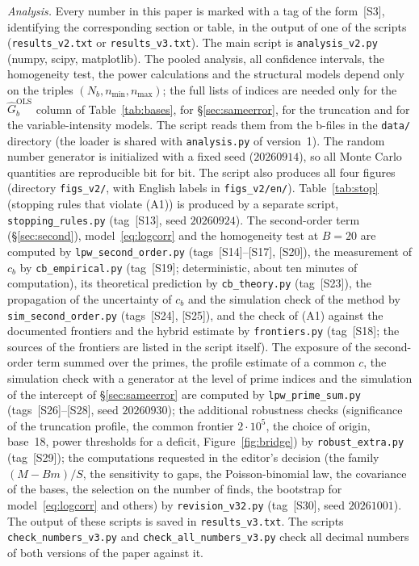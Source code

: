 \documentclass[11pt,a4paper]{article}
\theoremstyle{plain}
\theoremstyle{remark}
\begin{document}
\emph{Analysis.} Every number in this paper is marked with a tag of the
form~[S3], identifying the corresponding section or table, in the output of one
of the scripts (\texttt{results\_v2.txt} or \texttt{results\_v3.txt}). The main
script is \texttt{analysis\_v2.py} (numpy, scipy, matplotlib). The pooled
analysis, all confidence intervals, the homogeneity test, the power
calculations and the structural models depend only on the triples
$(N_b,n_{\min},n_{\max})$; the full lists of indices are needed only for the
$\hat G^{\mathrm{OLS}}_b$ column of Table~\ref{tab:bases}, for
\S\ref{sec:sameerror}, for the truncation and for the variable-intensity models.
The script reads them from the b-files in the \texttt{data/} directory (the
loader is shared with \texttt{analysis.py} of version~1). The random number
generator is initialized with a fixed seed ($20260914$), so all Monte Carlo
quantities are reproducible bit for bit. The script also produces all four
figures (directory \texttt{figs\_v2/}, with English labels in
\texttt{figs\_v2/en/}).
Table~\ref{tab:stop} (stopping rules that violate (A1)) is produced by a separate
script, \texttt{stopping\_rules.py} (tag~[S13], seed $20260924$). The
second-order term (\S\ref{sec:second}), model~\eqref{eq:logcorr} and the
homogeneity test at $B=20$ are computed by \texttt{lpw\_second\_order.py}
(tags~[S14]--[S17], [S20]), the measurement of $c_b$ by
\texttt{cb\_empirical.py} (tag~[S19]; deterministic, about ten minutes of
computation), its theoretical prediction by \texttt{cb\_theory.py}
(tag~[S23]), the propagation of the uncertainty of $c_b$ and the simulation check
of the method by \texttt{sim\_second\_order.py} (tags~[S24], [S25]), and the
check of (A1) against the documented frontiers and the hybrid estimate by
\texttt{frontiers.py} (tag~[S18]; the sources of the
frontiers are listed in the script itself). The exposure of the second-order term
summed over the primes, the profile estimate of a common $c$, the simulation
check with a generator at the level of prime indices and the simulation of the
intercept of \S\ref{sec:sameerror} are computed by \texttt{lpw\_prime\_sum.py}
(tags~[S26]--[S28], seed $20260930$); the additional robustness checks
(significance of the truncation profile, the common frontier $2\cdot10^5$, the
choice of origin, base~18, power thresholds for a deficit,
Figure~\ref{fig:bridge}) by \texttt{robust\_extra.py} (tag~[S29]); the
computations requested in the editor's decision (the family $(M-Bm)/S$, the
sensitivity to gaps, the Poisson-binomial law, the covariance of the bases, the
selection on the number of finds, the bootstrap for model~\eqref{eq:logcorr} and
others) by \texttt{revision\_v32.py} (tag~[S30], seed $20261001$). The output of
these scripts is saved in \texttt{results\_v3.txt}. The scripts \texttt{check\_numbers\_v3.py} and
\texttt{check\_all\_numbers\_v3.py} check all decimal numbers of both versions of
the paper against it.
\end{document}
